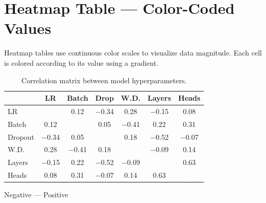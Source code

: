 \documentclass[
    language=english,
    doctype=article,
    institution=none,
]{../../omnilatex}
\begin{document}
\section{Heatmap Table — Color-Coded Values}
\label{sec:heatmap}

Heatmap tables use continuous color scales to visualize data magnitude. Each cell
is colored according to its value using a gradient.

\begin{table}[htbp]
    \centering
    \caption{Correlation matrix between model hyperparameters.}
    \label{tab:heatmap}
    \newcommand{\heatmapcell}[2]{%
        \ifdim #1 pt > 0.7pt \cellcolor{heat8!70!white}#2%
        \else\ifdim #1 pt > 0.5pt \cellcolor{heat5!50!white}#2%
        \else\ifdim #1 pt > 0.3pt \cellcolor{heat3!40!white}#2%
        \else\ifdim #1 pt > 0.1pt \cellcolor{heat1!80!white}#2%
        \else #2%
        \fi\fi\fi\fi%
    }
    \renewcommand{\arraystretch}{1.6}
    \begin{tabular}{l *{6}{c}}
        \toprule
        & \textbf{LR} & \textbf{Batch} & \textbf{Drop} & \textbf{W.D.} & \textbf{Layers} & \textbf{Heads} \\
        \midrule
        LR       & \cellcolor{heat8!80}\textcolor{white}{1.00} & 0.12 & $-$0.34 & 0.28 & $-$0.15 & 0.08 \\
        Batch    & 0.12 & \cellcolor{heat8!80}\textcolor{white}{1.00} & 0.05 & $-$0.41 & 0.22 & 0.31 \\
        Dropout  & $-$0.34 & 0.05 & \cellcolor{heat8!80}\textcolor{white}{1.00} & 0.18 & $-$0.52 & $-$0.07 \\
        W.D.     & 0.28 & $-$0.41 & 0.18 & \cellcolor{heat8!80}\textcolor{white}{1.00} & $-$0.09 & 0.14 \\
        Layers   & $-$0.15 & 0.22 & $-$0.52 & $-$0.09 & \cellcolor{heat8!80}\textcolor{white}{1.00} & 0.63 \\
        Heads    & 0.08 & 0.31 & $-$0.07 & 0.14 & 0.63 & \cellcolor{heat8!80}\textcolor{white}{1.00} \\
        \bottomrule
    \end{tabular}

    \vspace{0.5em}
    \hspace{2pt}
    \footnotesize Negative --- Positive
\end{table}

\printbibliography[heading=bibintoc, title={References}]
\end{document}
